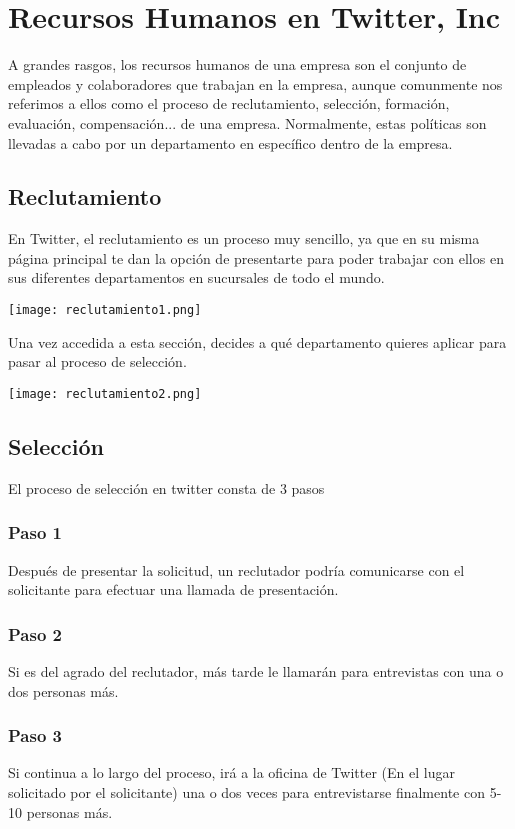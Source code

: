 

\section{Recursos Humanos en Twitter, Inc}

A grandes rasgos, los recursos humanos de una empresa son el conjunto de empleados y colaboradores que
trabajan en la empresa, aunque comunmente nos referimos a ellos como el proceso de reclutamiento, selección, formación, evaluación, compensación... de una empresa. Normalmente, estas políticas son llevadas a cabo por un departamento en específico dentro de la empresa.

\subsection{Reclutamiento}

En Twitter, el reclutamiento es un proceso muy sencillo, ya que en su misma página principal te dan la opción de presentarte para poder trabajar con ellos en sus diferentes departamentos en sucursales de todo el mundo.

\texttt{[image: reclutamiento1.png]}
\newpage

Una vez accedida a esta sección, decides a qué departamento quieres aplicar para pasar al proceso de selección.

\texttt{[image: reclutamiento2.png]}

\subsection{Selección}

El proceso de selección en twitter consta de 3 pasos

\subsubsection{Paso 1}
Después de presentar la solicitud, un reclutador podría comunicarse con el solicitante para efectuar una llamada de presentación.

\subsubsection{Paso 2}
Si es del agrado del reclutador, más tarde le llamarán para entrevistas con una o dos personas más.

\subsubsection{Paso 3}
Si continua a lo largo del proceso, irá a la oficina de Twitter (En el lugar solicitado por el solicitante) una o dos veces para entrevistarse finalmente con 5-10 personas más.

